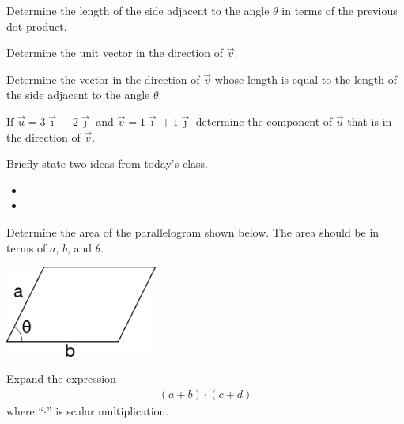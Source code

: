 \begin{problem}
\begin{subproblem}
    \item Determine the length of the side adjacent to the angle $\theta$ in terms of the previous dot product.
      \vfill

    \item Determine the unit vector in the direction of $\vec{v}$.
      \vfill

    \item Determine the vector in the direction of $\vec{v}$ whose length is equal to the length of the side adjacent to the angle $\theta$.
      \vfill

  \end{subproblem}

  \clearpage

  \item If $\vec{u}=3\vec{\imath}+2\vec{\jmath}$ and $\vec{v}=1\vec{\imath}+1\vec{\jmath}$ determine the component of $\vec{u}$ that is in the direction of $\vec{v}$.
    \vfill

\end{problem}

\postClass

\begin{problem}
\item Briefly state two ideas from today's class.
  \begin{itemize}
  \item
  \item
  \end{itemize}
\item
  \begin{subproblem}
    \item
  \end{subproblem}
\end{problem}



\begin{problem}
\item Determine the area of the parallelogram shown below. The area
  should be in terms of $a$, $b$, and $\theta$.

  \includegraphics[width=5cm]{../semI/ink/week11/parallelogram}

  \vfill

\item Expand the expression
  \begin{eqnarray*}
    \left( a + b \right) \cdot \left( c + d \right)
  \end{eqnarray*}
  where ``$\cdot$'' is scalar multiplication.

  \vfill

\end{problem}


